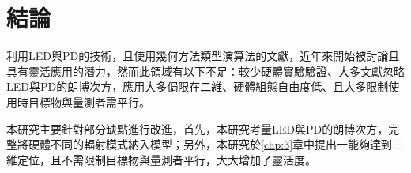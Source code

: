 

        



\section{結論}
\label{chp:2_conclusion}

利用LED與PD的技術，且使用幾何方法類型演算法的文獻，近年來開始被討論且具有靈活應用的潛力，然而此領域有以下不足：較少硬體實驗驗證、大多文獻忽略LED與PD的朗博次方，應用大多侷限在二維、硬體組態自由度低、且大多限制使用時目標物與量測者需平行。

本研究主要針對部分缺點進行改進，首先，本研究考量LED與PD的朗博次方，完整將硬體不同的輻射模式納入模型；另外，本研究於\ref{chp:3}章中提出一能夠達到三維定位，且不需限制目標物與量測者平行，大大增加了靈活度。

